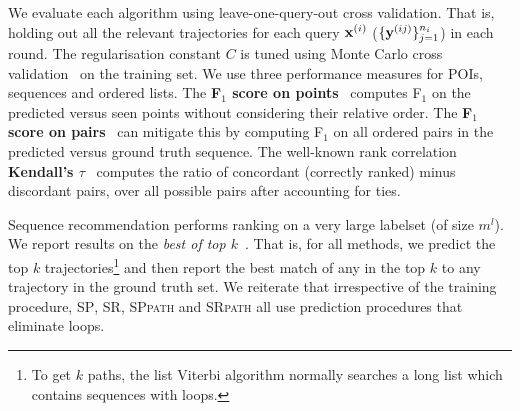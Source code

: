 We evaluate each algorithm using leave-one-query-out cross validation.
That is, holding out all the relevant trajectories for each query $\mathbf{x}^{({i})}$ (\ie $\{\mathbf{y}^{({ij})}\}_{j=1}^{n_i}$) in each round.
The regularisation constant $C$ is tuned using Monte Carlo cross validation~\cite{burman1989comparative} on the training set.
We use three performance measures for POIs, sequences and ordered lists.
The {\bf F$_1$ score on points}~\cite{ijcai15} computes F$_1$ on the predicted versus seen points
without considering their relative order.
The {\bf F$_1$ score on pairs}~\cite{cikm16paper} %
can mitigate this by computing F$_1$ on all ordered pairs in the predicted versus ground truth sequence. %
The well-known rank correlation {\bf Kendall's $\tau$}~\cite{agresti2010analysis}
computes the ratio of concordant (correctly ranked) %
minus discordant pairs, over all possible pairs after accounting for ties.%

Sequence recommendation performs ranking on a very large labelset (of size $m^l$).
We report results on the {\em best of top $k$}~\cite{russakovsky2015imagenet}.
That is, for all methods, %
we predict the top $k$ trajectories\footnote{To get $k$ paths, the list Viterbi algorithm normally searches a long list which contains sequences with loops.}
and then report the best match of any in the top $k$ to any trajectory in the ground truth set.
We reiterate that irrespective of the training procedure, \textsc{SP}, \textsc{SR},
\textsc{SPpath} and \textsc{SRpath} all use prediction procedures that eliminate loops. %

